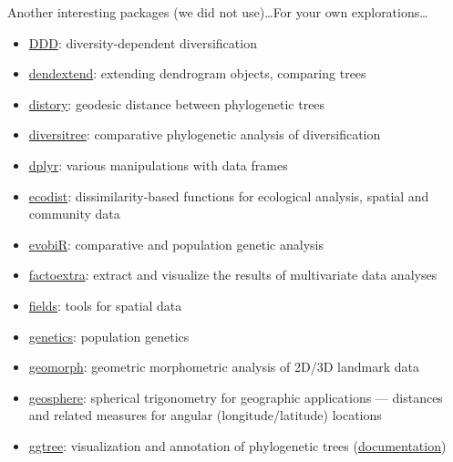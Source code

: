 \documentclass[compress, xelatex, 11pt, xcolor=svgnames, aspectratio=169,
	hyperref={
		bookmarks=true,
		unicode=true,
		colorlinks=true,
		pdftitle={Molecular data in R},
		plainpages=false,
		pdfauthor={Vojtech Zeisek},
		pdfsubject={Course about phylogeny and evolution in R},
		pdfcreator={XeLaTeX},
		pdfkeywords={R, evolution, phylogeny, molecular data},
		linkcolor=Crimson, %
		anchorcolor=Magenta, %
		citecolor=Magenta, %
		filecolor=Magenta, %
		menucolor=Magenta, %
		urlcolor=DodgerBlue, %
		},
	url={hyphens, lowtilde} %
	]{beamer}
\begin{document}
\begin{frame}[allowframebreaks]{Another interesting packages (we did not use)\ldots}{For your own explorations\ldots}
\begin{itemize}
		\item \href{https://CRAN.R-project.org/package=DDD}{DDD}: diversity-dependent diversification
		\item \href{https://CRAN.R-project.org/package=dendextend}{dendextend}: extending dendrogram objects, comparing trees
		\item \href{https://CRAN.R-project.org/package=distory}{distory}: geodesic distance between phylogenetic trees
		\item \href{https://CRAN.R-project.org/package=diversitree}{diversitree}: comparative phylogenetic analysis of diversification
		\item \href{https://CRAN.R-project.org/package=dplyr}{dplyr}: various manipulations with data frames
		\item \href{https://CRAN.R-project.org/package=ecodist}{ecodist}: dissimilarity-based functions for ecological analysis, spatial and community data
		\item \href{https://CRAN.R-project.org/package=evobiR}{evobiR}: comparative and population genetic analysis
		\item \href{https://CRAN.R-project.org/package=factoextra}{factoextra}: extract and visualize the results of multivariate data analyses
		\item \href{https://CRAN.R-project.org/package=fields}{fields}: tools for spatial data
		\item \href{https://CRAN.R-project.org/package=genetics}{genetics}: population genetics
		\item \href{https://CRAN.R-project.org/package=geomorph}{geomorph}: geometric morphometric analysis of 2D/3D landmark data
		\item \href{https://CRAN.R-project.org/package=geosphere}{geosphere}: spherical trigonometry for geographic applications --- distances and related measures for angular (longitude/latitude) locations
		\item \href{https://bioconductor.org/packages/release/bioc/html/ggtree.html}{ggtree}: visualization and annotation of phylogenetic trees (\href{https://guangchuangyu.github.io/software/ggtree/documentation/}{documentation})

\end{itemize}
\end{frame}
\end{document}
